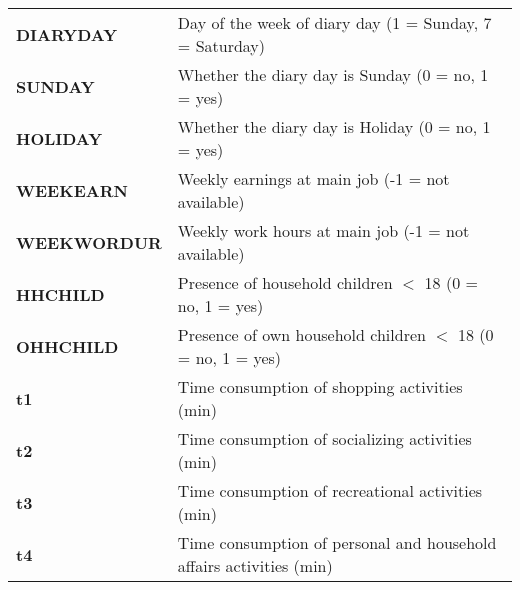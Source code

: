 \documentclass[12pt,a4paper]{article}
\begin{document}
\begin{longtable}{|p{}|p{}|}
\textbf{DIARYDAY} &

Day of the week of diary day (1 = Sunday, 7 = Saturday) \\

\textbf{SUNDAY} &

Whether the diary day is Sunday (0 = no, 1 = yes) \\

\textbf{HOLIDAY} &

Whether the diary day is Holiday (0 = no, 1 = yes) \\

\textbf{WEEKEARN} &

Weekly earnings at main job (-1 = not available) \\

\textbf{WEEKWORDUR} &

Weekly work hours at main job (-1 = not available) \\

\textbf{HHCHILD} &

Presence of household children $<$ 18 (0 = no, 1 = yes) \\

\textbf{OHHCHILD} &

Presence of own household children $<$ 18 (0 = no, 1 = yes) \\

\textbf{t1} &

Time consumption of shopping activities (min) \\

\textbf{t2} &

Time consumption of socializing activities (min) \\

\textbf{t3} &

Time consumption of recreational activities (min) \\

\textbf{t4} &

Time consumption of personal and household affairs activities (min) \\

\end{longtable}
\end{document}

